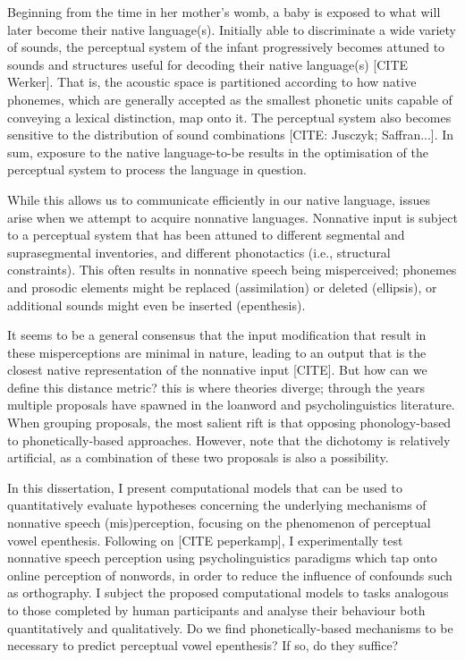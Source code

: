 

Beginning from the time in her mother's womb, a baby is exposed to what will later become their native language(s). Initially able to discriminate a wide variety of sounds, the perceptual system of the infant progressively becomes attuned to sounds and structures useful for decoding their native language(s) [CITE Werker]. That is, the acoustic space is partitioned according to how native phonemes, which are generally accepted as the smallest phonetic units capable of conveying a lexical distinction, map onto it. The perceptual system also becomes sensitive to the distribution of sound combinations [CITE: Jusczyk; Saffran...]. In sum, exposure to the native language-to-be results in the optimisation of the perceptual system to process the language in question.

While this allows us to communicate efficiently in our native language, issues arise when we attempt to acquire nonnative languages. Nonnative input is subject to a perceptual system that has been attuned to different segmental and suprasegmental inventories, and different phonotactics (i.e., structural constraints). This often results in nonnative speech being misperceived; phonemes and prosodic elements might be replaced (assimilation) or deleted (ellipsis), or additional sounds might even be inserted (epenthesis).

It seems to be a general consensus that the input modification that result in these misperceptions are minimal in nature, leading to an output that is the closest native representation of the nonnative input [CITE]. But how can we define this distance metric? this is where theories diverge; through the years multiple proposals have spawned in the loanword and psycholinguistics literature. When grouping proposals, the most salient rift is that opposing phonology-based to phonetically-based approaches. However, note that the dichotomy is relatively artificial, as a combination of these two proposals is also a possibility.

In this dissertation, I present computational models that can be used to quantitatively evaluate hypotheses concerning the underlying mechanisms of nonnative speech (mis)perception, focusing on the phenomenon of perceptual vowel epenthesis. Following on [CITE peperkamp], I experimentally test nonnative speech perception using psycholinguistics paradigms which tap onto online perception of nonwords, in order to reduce the influence of confounds such as orthography. I subject the proposed computational models to tasks analogous to those completed by human participants and analyse their behaviour both quantitatively and qualitatively. Do we find phonetically-based mechanisms to be necessary to predict perceptual vowel epenthesis? If so, do they suffice? 


